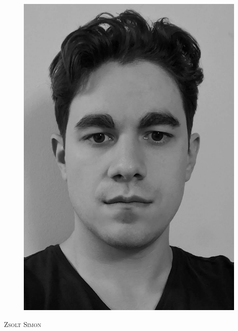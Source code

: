 

\setlength{\parindent}{0em}

\def \leftHeader{CV}
\def \rightHeader{Zsolt Simon}
\def \position{}

\setmainfont[Mapping=tex-text,Numbers=OldStyle,Ligatures=TeX]{Linux Biolinum O}



\begin{figure}
  \flushright
  \includegraphics[scale=0.4]{portrait_mono} 
\end{figure}

\begin{Large}
  \textsc{Zsolt Simon}
  \vspace{1em}
\end{Large}

\large

